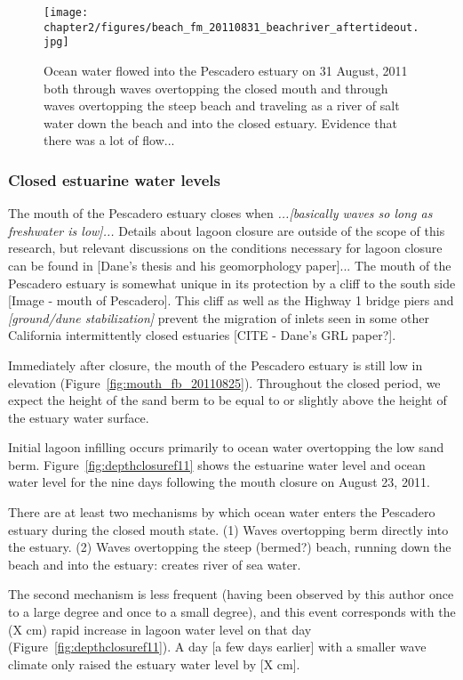 \begin{figure}
\texttt{[image: chapter2/figures/beach\_fm\_20110831\_beachriver\_aftertideout.jpg]} \caption{Ocean water flowed into the Pescadero estuary on 31 August, 2011 both through waves overtopping the closed mouth and through waves overtopping the steep beach and traveling as a river of salt water down the beach and into the closed estuary. Evidence that there was a lot of flow...}
\label{fig:beachriver_after} \end{figure}

\subsubsection{Closed estuarine water levels} \label{cl_wl}
The mouth of the Pescadero estuary closes when \emph{...[basically waves
so long as freshwater is low]...} Details about lagoon closure are
outside of the scope of this research, but relevant discussions on the
conditions necessary for lagoon closure can be found in [Dane's thesis
and his geomorphology paper]... The mouth of the Pescadero estuary is
somewhat unique in its protection by a cliff to the south side [Image -
mouth of Pescadero]. This cliff as well as the Highway 1 bridge piers
and \emph{[ground/dune stabilization]} prevent the migration of inlets
seen in some other California intermittently closed estuaries [CITE -
Dane's GRL paper?].

Immediately after closure, the mouth of the Pescadero estuary is still
low in elevation (Figure~\ref{fig:mouth_fb_20110825}). Throughout the closed period, we
expect the height of the sand berm to be equal to or slightly above the
height of the estuary water surface.

Initial lagoon infilling occurs primarily to ocean water overtopping the
low sand berm. Figure~\ref{fig:depthclosuref11} shows the estuarine water level and ocean
water level for the nine days following the mouth closure on August 23, 2011. 

There are at least two mechanisms by which ocean water enters the
Pescadero estuary during the closed mouth state. (1) Waves overtopping
berm directly into the estuary. (2) Waves overtopping the steep
(bermed?) beach, running down the beach and into the estuary: creates
river of sea water.

The second mechanism is less frequent (having been observed by this author once to a large degree and once to a small degree), and this event corresponds with 
the (X cm) rapid increase in lagoon water level on that day (Figure~\ref{fig:depthclosuref11}). A day
[a few days earlier] with a smaller wave climate only raised the estuary
water level by [X cm].

